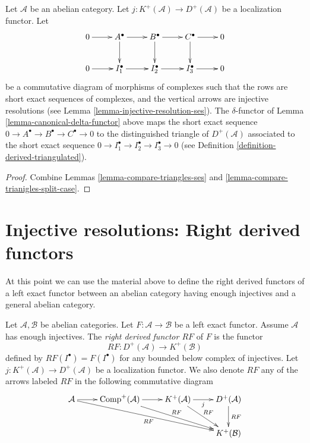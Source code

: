 \begin{lemma}
\label{lemma-ses-injective-ses}
Let $\mathcal{A}$ be an abelian category.
Let $j : K^{+}(\mathcal{A}) \to D^{+}(\mathcal{A})$ be
a localization functor.
Let
$$
\xymatrix{
0 \ar[r] &
A^\bullet \ar[r] \ar[d] &
B^\bullet \ar[r] \ar[d] &
C^\bullet \ar[r] \ar[d] &
0 \\
0 \ar[r] &
I_1^\bullet \ar[r] &
I_2^\bullet \ar[r] &
I_3^\bullet \ar[r] &
0
}
$$
be a commutative diagram of morphisms of complexes
such that the rows are short exact sequences of complexes, and
the vertical arrows are injective resolutions
(see Lemma \ref{lemma-injective-resolution-ses}).
The $\delta$-functor of Lemma \ref{lemma-canonical-delta-functor} above
maps the short exact sequence
$0 \to A^\bullet \to B^\bullet \to C^\bullet \to 0$
to the distinguished triangle of $D^{+}(\mathcal{A})$
associated to the short exact sequence
$0 \to I_1^\bullet \to I_2^\bullet \to I_3^\bullet \to 0$
(see Definition \ref{definition-derived-triangulated}).
\end{lemma}

\begin{proof}
Combine Lemmas \ref{lemma-compare-triangles-ses}
and \ref{lemma-compare-trianigles-split-case}.
\end{proof}






\section{Injective resolutions: Right derived functors}
\label{section-right-derived-functor}

\noindent
At this point we can use the material above to define the right derived
functors of a left exact functor between an abelian category having
enough injectives and a general abelian category.

\begin{definition}
\label{definition-right-derived-functor}
Let $\mathcal{A}, \mathcal{B}$ be abelian categories.
Let $F : \mathcal{A} \to \mathcal{B}$ be a left exact functor.
Assume $\mathcal{A}$ has enough injectives.
The {\it right derived functor $RF$} of $F$ is the functor
$$
RF : D^{+}(\mathcal{A}) \longrightarrow K^{+}(\mathcal{B})
$$
defined by $RF(I^\bullet) = F(I^\bullet)$ for any bounded
below complex of injectives.
Let $j : K^{+}(\mathcal{A}) \to D^{+}(\mathcal{A})$ be
a localization functor. We also denote $RF$ any of the arrows
labeled $RF$ in the following commutative diagram
$$
\xymatrix{
\mathcal{A} \ar[r] \ar[rrrd]_{RF} &
\text{Comp}^{+}(\mathcal{A}) \ar[r] \ar[rrd]^{RF} &
K^{+}(\mathcal{A}) \ar[r]_j \ar[rd]^{RF} &
D^{+}(\mathcal{A}) \ar[d]^{RF} \\
& & & K^{+}(\mathcal{B})
}
$$
\end{definition}

